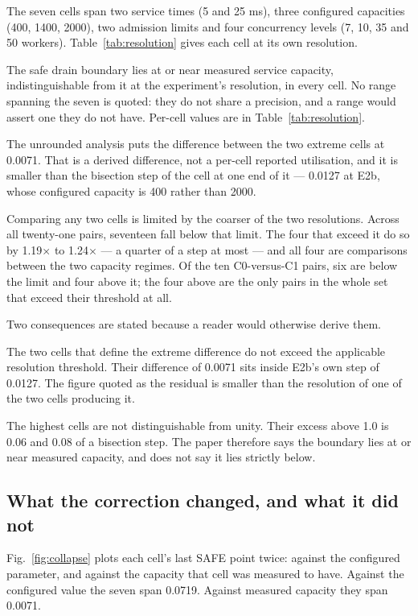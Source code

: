 \documentclass{ieeeaccess}
\begin{document}
The seven cells span two service times (5 and 25 ms), three configured capacities (400, 1400, 2000), two admission limits and four concurrency levels (7, 10, 35 and 50 workers). Table~\ref{tab:resolution} gives each cell at its own resolution.

The safe drain boundary lies at or near measured service capacity, indistinguishable from it at the experiment's resolution, in every cell. No range spanning the seven is quoted: they do not share a precision, and a range would assert one they do not have. Per-cell values are in Table~\ref{tab:resolution}.

The unrounded analysis puts the difference between the two extreme cells at 0.0071. That is a derived difference, not a per-cell reported utilisation, and it is smaller than the bisection step of the cell at one end of it --- 0.0127 at E2b, whose configured capacity is 400 rather than 2000.

Comparing any two cells is limited by the coarser of the two resolutions. Across all twenty-one pairs, seventeen fall below that limit. The four that exceed it do so by 1.19$\times$ to 1.24$\times$ --- a quarter of a step at most --- and all four are comparisons between the two capacity regimes. Of the ten C0-versus-C1 pairs, six are below the limit and four above it; the four above are the only pairs in the whole set that exceed their threshold at all.

Two consequences are stated because a reader would otherwise derive them.

The two cells that define the extreme difference do not exceed the applicable resolution threshold. Their difference of 0.0071 sits inside E2b's own step of 0.0127. The figure quoted as the residual is smaller than the resolution of one of the two cells producing it.

The highest cells are not distinguishable from unity. Their excess above 1.0 is 0.06 and 0.08 of a bisection step. The paper therefore says the boundary lies at or near measured capacity, and does not say it lies strictly below.

\subsection{What the correction changed, and what it did not}

Fig.~\ref{fig:collapse} plots each cell's last SAFE point twice: against the configured parameter, and against the capacity that cell was measured to have. Against the configured value the seven span 0.0719. Against measured capacity they span 0.0071.
\end{document}
